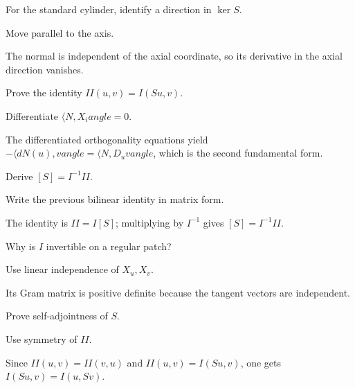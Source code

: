 \begin{exercise}\label{exr:vii16-08}
For the standard cylinder, identify a direction in \(\ker S\).
\end{exercise}
\begin{hint}
Move parallel to the axis.
\end{hint}
\begin{solution}
The normal is independent of the axial coordinate, so its derivative in the axial direction vanishes.
\end{solution}

\begin{exercise}\label{exr:vii16-09}
Prove the identity \(II(u,v)=I(Su,v)\).
\end{exercise}
\begin{hint}
Differentiate \(\langle N,X_i
angle=0\).
\end{hint}
\begin{solution}
The differentiated orthogonality equations yield \(-\langle dN(u),v
angle=\langle N,D_uv
angle\), which is the second fundamental form.
\end{solution}

\begin{exercise}\label{exr:vii16-10}
Derive \([S]=I^{-1}II\).
\end{exercise}
\begin{hint}
Write the previous bilinear identity in matrix form.
\end{hint}
\begin{solution}
The identity is \(II=I[S]\); multiplying by \(I^{-1}\) gives \([S]=I^{-1}II\).
\end{solution}

\begin{exercise}\label{exr:vii16-11}
Why is \(I\) invertible on a regular patch?
\end{exercise}
\begin{hint}
Use linear independence of \(X_u,X_v\).
\end{hint}
\begin{solution}
Its Gram matrix is positive definite because the tangent vectors are independent.
\end{solution}

\begin{exercise}\label{exr:vii16-12}
Prove self-adjointness of \(S\).
\end{exercise}
\begin{hint}
Use symmetry of \(II\).
\end{hint}
\begin{solution}
Since \(II(u,v)=II(v,u)\) and \(II(u,v)=I(Su,v)\), one gets \(I(Su,v)=I(u,Sv)\).
\end{solution}

